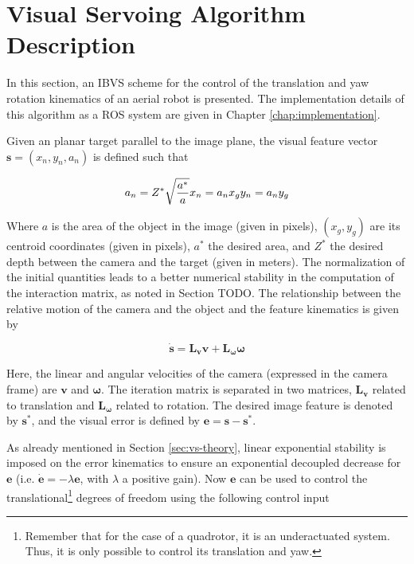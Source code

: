 \section{Visual Servoing Algorithm Description}
\label{sec:vs-algorithm-description}

In this section, an IBVS scheme for the control of the translation and yaw rotation kinematics \cite{bourquardez_2009} of an aerial robot is presented. The implementation details of this algorithm as a ROS system are given in Chapter \ref{chap:implementation}. 

Given an planar target parallel to the image plane, the visual feature vector $\bm{s} = (x_n, y_n, a_n)$ is defined such that

\begin{equation*}
a_n = Z^\ast \sqrt{\frac{a^\ast}{a}} \\
x_n = a_n x_g \\
 y_n = a_n y_g 
\end{equation*}

Where $a$ is the area of the object in the image (given in pixels), $\left( x_g , y_g \right) $ are its centroid coordinates (given in pixels), $a^\ast$ the desired area, and $Z^\ast$ the desired depth between the camera and the target (given in meters). The normalization of the initial quantities leads to a better numerical stability in the computation of the interaction matrix, as noted in Section TODO. The relationship between the relative motion of the camera and the object and the feature kinematics is given by

\begin{equation}
\dot{\bm{s}} = \bm{L_v} \bm{v} + \bm{L_\omega} \bm{\omega}
\end{equation}

Here, the linear and angular velocities of the camera (expressed in the camera frame) are $\bm{v}$ and $\bm{\omega}$. The iteration matrix is separated in two matrices, $\bm{L_v}$ related to translation and $\bm{L_\omega}$ related to rotation. The desired image feature is denoted by $\bm{s}^\ast$, and the visual error is defined by $\bm{e} = \bm{s} - \bm{s}^\ast$.

As already mentioned in Section \ref{sec:vs-theory}, linear exponential stability is imposed on the error kinematics to ensure an exponential decoupled decrease for $\bm{e}$ (i.e. $\dot{\bm{e}} = - \lambda \bm{e}$, with $\lambda$ a positive gain). Now $\bm{e}$ can be used to control the translational\footnote{Remember that for the case of a quadrotor, it is an underactuated system. Thus, it is only possible to control its translation and yaw.} degrees of freedom using the following control input

